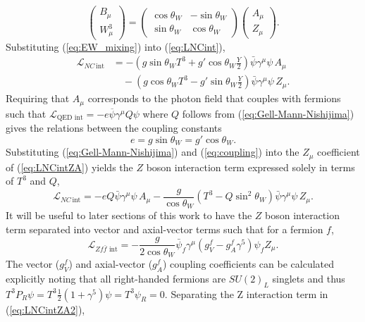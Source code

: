 \begin{equation}\label{eq:EW_mixing}
\begin{pmatrix}B_\mu \\ W^3_\mu\end{pmatrix} = \begin{pmatrix}\cos\theta_W & -\sin\theta_W \\ \sin\theta_W & \cos\theta_W\end{pmatrix}\begin{pmatrix}A_\mu \\ Z_\mu\end{pmatrix}.
\end{equation}
Substituting (\ref{eq:EW_mixing}) into (\ref{eq:LNCint}),
\begin{equation}\label{eq:LNCintZA}
\begin{split}
\mathcal{L}_{NC\,\text{int}} &= -\left(g\sin\theta_W T^3 + g'\cos\theta_W\frac{Y}{2}\right)\bar{\psi}\gamma^\mu\psi\, A_\mu \\ &\quad - \left(g\cos\theta_W T^3 - g'\sin\theta_W\frac{Y}{2}\right)\bar{\psi}\gamma^\mu\psi\, Z_\mu.
\end{split}
\end{equation}
Requiring that $A_\mu$ corresponds to the photon field that couples with fermions such that $\mathcal{L}_{\text{QED int}} = -e\overline{\psi}\gamma^\mu Q \psi$ where $Q$ follows from (\ref{eq:Gell-Mann-Nishijima}) gives the relations between the coupling constants
\begin{equation}\label{eq:coupling}
e = g\sin\theta_W = g'\cos\theta_W.
\end{equation}
Substituting (\ref{eq:Gell-Mann-Nishijima}) and (\ref{eq:coupling}) into the $Z_\mu$ coefficient of (\ref{eq:LNCintZA}) yields the $Z$ boson interaction term expressed solely in terms of $T^3$ and $Q$,
\begin{equation}\label{eq:LNCintZA2}
\mathcal{L}_{NC\,\text{int}} = -eQ\bar{\psi}\gamma^\mu\psi\, A_\mu - \frac{g}{\cos\theta_W}\left(T^3 - Q\sin^2\theta_W\right)\bar{\psi}\gamma^\mu\psi\, Z_\mu.
\end{equation}
It will be useful to later sections of this work to have the $Z$ boson interaction term separated into vector and axial-vector terms such that for a fermion $f$,
\begin{equation}\label{eq:gvga}
  \mathcal{L}_{Zf\bar{f}\text{ int}} = -\frac{g}{2\cos\theta_W}\bar{\psi}_f\gamma^\mu(g^f_{V} - g^f_{A}\gamma^5) \psi_f Z_\mu.
\end{equation}
The vector ($g^f_V$) and axial-vector ($g^f_A$) coupling coefficients can be calculated explicitly noting that all right-handed fermions are $SU(2)_L$ singlets and thus $T^3P_R \psi = T^3\frac{1}{2}(1+\gamma^5)\psi = T^3\psi_R = 0$. Separating the Z interaction term in (\ref{eq:LNCintZA2}),
